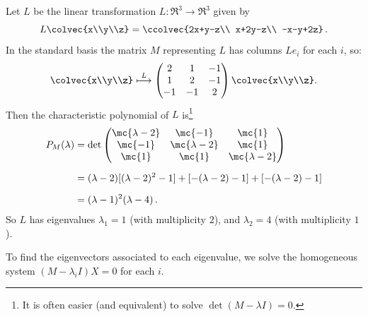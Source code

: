 \begin{example}
Let $L$ be the linear transformation $L \colon \Re^3\rightarrow \Re^3$ given by 
\[L\colvec{x\\y\\z}=\ccolvec{2x+y-z\\ x+2y-z\\ -x-y+2z}\, .\] 
In the standard basis the matrix $M$ representing $L$ has columns $Le_i$ for each $i$, so:
\[
\colvec{x\\y\\z} \stackrel{L}{\longmapsto} 
\begin{pmatrix}
2 & 1 & -1\\
1 & 2 & -1\\
-1 & -1 & 2\\
\end{pmatrix}\colvec{x\\y\\z}.
\]
Then the characteristic polynomial of $L$ is\footnote{It is often easier (and equivalent) to solve $\det (M-\lambda I)=0$.}
\begin{align*}
P_M(\lambda)&=\det \begin{pmatrix}
\mc{\lambda - 2} &\mc{ -1} & \mc{1}\\
\mc{-1} &\mc{ \lambda - 2} & \mc{1}\\
\mc{1} & \mc{1} & \mc{\lambda - 2}\\
\end{pmatrix}\\[2mm]
&= (\lambda - 2)[ (\lambda - 2)^2-1 ] + 
[-(\lambda - 2)-1 ] +
[-(\lambda - 2)-1] \\[2mm]
&= (\lambda - 1)^2(\lambda - 4)\, .
\end{align*}
So $L$ has eigenvalues $\lambda_1=1$ (with multiplicity $2$), and $\lambda_2=4$ (with multiplicity $1$).

To find the eigenvectors associated to each eigenvalue, we solve the homogeneous system $(M-\lambda_iI)X=0$ for each $i$.


\end{example}
